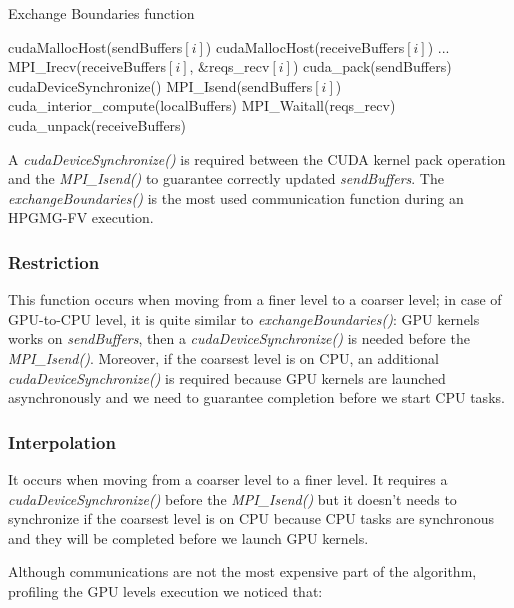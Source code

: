 \documentclass[conference]{IEEEtran}
\begin{document}
\begin{algorithm}
\small
\caption{Exchange Boundaries function}
\label{algo:exchange_boundaries}
\begin{algorithmic}[1]
\State cudaMallocHost(sendBuffers$[i]$)
\State cudaMallocHost(receiveBuffers$[i]$)
\EndFor
\State ...
 \label{alg:b}
		\State MPI\_Irecv(receiveBuffers$[i]$, \&reqs\_recv$[i]$)    
	\EndFor
	\State cuda\_pack(sendBuffers)
	\State cudaDeviceSynchronize()
		\State MPI\_Isend(sendBuffers$[i]$)    
	\EndFor
	\State cuda\_interior\_compute(localBuffers)
	\State MPI\_Waitall(reqs\_recv)
	\State cuda\_unpack(receiveBuffers)
\EndFunction
\end{algorithmic}
\end{algorithm}

A \textit{cudaDeviceSynchronize()} is required between the CUDA kernel pack operation and the \textit{MPI\_Isend()} to guarantee correctly updated \textit{sendBuffers}.
The \textit{exchangeBoundaries()} is the most used communication function during an HPGMG-FV execution.

\subsubsection{Restriction}

This function occurs when moving from a finer level to a coarser level; in case of GPU-to-CPU level, it is quite similar to \textit{exchangeBoundaries()}: GPU kernels works on \textit{sendBuffers}, then a \textit{cudaDeviceSynchronize()} is needed before the \textit{MPI\_Isend()}. Moreover, if the coarsest level is on CPU, an additional \textit{cudaDeviceSynchronize()} is required because GPU kernels are launched asynchronously and we need to guarantee completion before we start CPU tasks.

\subsubsection{Interpolation}

It occurs when moving from a coarser level to a finer level. It requires a \textit{cudaDeviceSynchronize()} before the \textit{MPI\_Isend()} but it doesn't needs to synchronize if the coarsest level is on CPU because CPU tasks are synchronous and they will be completed before we launch GPU kernels.

Although communications are not the most expensive part of the algorithm, profiling the GPU levels execution we noticed that:
\end{document}
